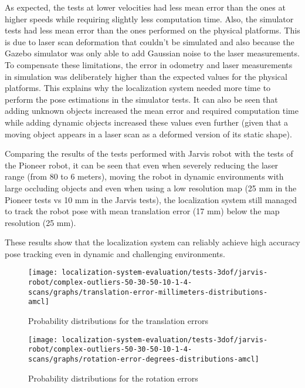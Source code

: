 As expected, the tests at lower velocities had less mean error than the ones at higher speeds while requiring slightly less computation time. Also, the simulator tests had less mean error than the ones performed on the physical platforms. This is due to laser scan deformation that couldn't be simulated and also because the Gazebo simulator was only able to add Gaussian noise to the laser measurements. To compensate these limitations, the error in odometry and laser measurements in simulation was deliberately higher than the expected values for the physical platforms. This explains why the localization system needed more time to perform the pose estimations in the simulator tests. It can also be seen that adding unknown objects increased the mean error and required computation time while adding dynamic objects increased these values even further (given that a moving object appears in a laser scan as a deformed version of its static shape).

Comparing the results of the tests performed with Jarvis robot  with the tests of the Pioneer robot, it can be seen that even when severely reducing the laser range (from 80 to 6 meters), moving the robot in dynamic environments with large occluding objects and even when using a low resolution map (25 mm in the Pioneer tests vs 10 mm in the Jarvis tests), the localization system still managed to track the robot pose with mean translation error (17 mm) below the map resolution (25 mm).

These results show that the localization system can reliably achieve high accuracy pose tracking even in dynamic and challenging environments.

\begin{figure}[H]
	\centering
	\begin{minipage}[H]{0.49\textwidth}
		\centering
		\texttt{[image: localization-system-evaluation/tests-3dof/jarvis-robot/complex-outliers-50-30-50-10-1-4-scans/graphs/translation-error-millimeters-distributions-amcl]}
		\caption{Probability distributions for the  translation errors}
		\label{fig:localization-system-evaluation_complex-path-with-outliers-50-30-50-10cm-per-sec-velocity-1-4-translation-error-amcl}
	\end{minipage}\hfill
	\begin{minipage}[H]{0.49\textwidth}
		\centering
		\texttt{[image: localization-system-evaluation/tests-3dof/jarvis-robot/complex-outliers-50-30-50-10-1-4-scans/graphs/rotation-error-degrees-distributions-amcl]}
		\caption{Probability distributions for the  rotation errors}
		\label{fig:localization-system-evaluation_complex-path-with-outliers-50-30-50-10cm-per-sec-velocity-1-4-rotation-error-amcl}
	\end{minipage}
\end{figure}

